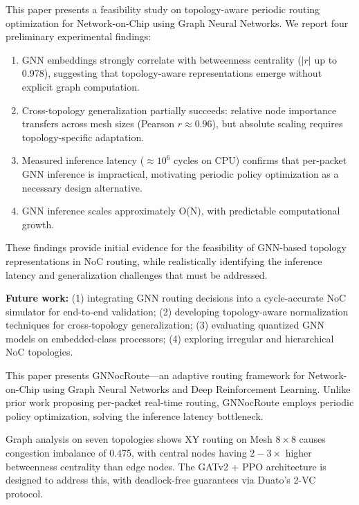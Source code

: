 \documentclass[conference]{IEEEtran}
\begin{document}
This paper presents a feasibility study on topology-aware periodic routing optimization for Network-on-Chip using Graph Neural Networks. We report four preliminary experimental findings:

\begin{enumerate}
    \item GNN embeddings strongly correlate with betweenness centrality ($|r|$ up to 0.978), suggesting that topology-aware representations emerge without explicit graph computation.
    \item Cross-topology generalization partially succeeds: relative node importance transfers across mesh sizes (Pearson $r \approx 0.96$), but absolute scaling requires topology-specific adaptation.
    \item Measured inference latency ($\approx 10^6$ cycles on CPU) confirms that per-packet GNN inference is impractical, motivating periodic policy optimization as a necessary design alternative.
    \item GNN inference scales approximately O(N), with predictable computational growth.
\end{enumerate}

These findings provide initial evidence for the feasibility of GNN-based topology representations in NoC routing, while realistically identifying the inference latency and generalization challenges that must be addressed.

\textbf{Future work:} (1) integrating GNN routing decisions into a cycle-accurate NoC simulator for end-to-end validation; (2) developing topology-aware normalization techniques for cross-topology generalization; (3) evaluating quantized GNN models on embedded-class processors; (4) exploring irregular and hierarchical NoC topologies.

\label{sec:conclusion}

This paper presents GNNocRoute---an adaptive routing framework for Network-on-Chip using Graph Neural Networks and Deep Reinforcement Learning. Unlike prior work proposing per-packet real-time routing, GNNocRoute employs periodic policy optimization, solving the inference latency bottleneck.

Graph analysis on seven topologies shows XY routing on Mesh $8\times8$ causes congestion imbalance of 0.475, with central nodes having $2{-}3\times$ higher betweenness centrality than edge nodes. The GATv2 + PPO architecture is designed to address this, with deadlock-free guarantees via Duato's 2-VC protocol.
\end{document}
